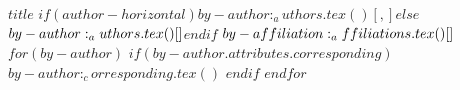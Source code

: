 \doublespacing

\begin{flushleft}


\Large{
  \textbf{$title$}
}
\newline
\newline
$if(author-horizontal)$$by-author:_authors.tex()[, ]$$else$$by-author:_authors.tex()[\newline ]$$endif$
\newline
\newline
$by-affiliation:_affiliations.tex()[\newline ]$
\newline
\newline
$for(by-author)$
$if(by-author.attributes.corresponding)$
$by-author:_corresponding.tex()$
$endif$
$endfor$

\end{flushleft}

\pagebreak
{}
\linenumbers
